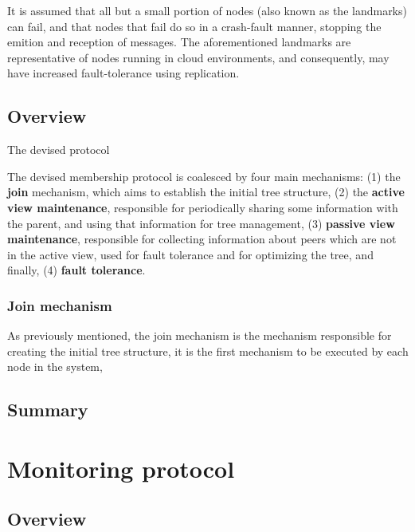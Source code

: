 It is assumed that all but a small portion of nodes (also known as the landmarks) can fail, and that nodes that fail do so in a crash-fault manner, stopping the emition and reception of messages. The aforementioned landmarks are representative of nodes running in cloud environments, and consequently, may have increased fault-tolerance using replication.

\subsection{Overview}

The devised protocol

The devised membership protocol is coalesced by four main mechanisms: (1) the \textbf{join} mechanism, which aims to establish the initial tree structure, (2) the \textbf{active view maintenance}, responsible for periodically sharing some information with the parent, and using that information for tree management, (3) \textbf{passive view maintenance}, responsible for collecting information about peers which are not in the active view, used for fault tolerance and for optimizing the tree, and finally, (4) \textbf{fault tolerance}.

\subsubsection{Join mechanism}

As previously mentioned, the join mechanism is the mechanism responsible for creating the initial tree structure, it is the first mechanism to be executed by each node in the system,







\subsection{Summary}

\section{Monitoring protocol}

\subsection{Overview}

